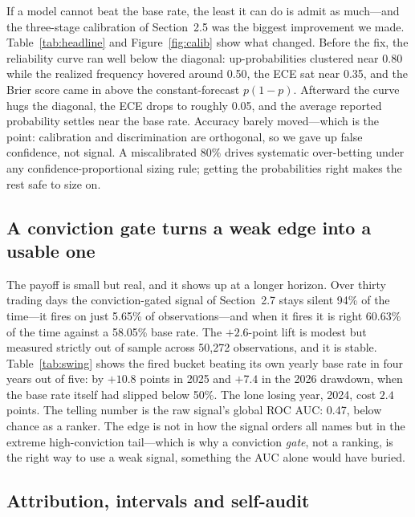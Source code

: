 \documentclass[12pt,a4paper]{article}
\begin{document}
If a model cannot beat the base rate, the least it can do is admit as much---and the
three-stage calibration of Section~2.5 was the biggest improvement we made.
Table~\ref{tab:headline} and Figure~\ref{fig:calib} show what changed. Before the
fix, the reliability curve ran well below the diagonal: up-probabilities clustered
near 0.80 while the realized frequency hovered around 0.50, the ECE sat near 0.35,
and the Brier score came in above the constant-forecast $p(1-p)$. Afterward the
curve hugs the diagonal, the ECE drops to roughly 0.05, and the average reported
probability settles near the base rate. Accuracy barely moved---which is the point:
calibration and discrimination are orthogonal, so we gave up false confidence, not
signal. A miscalibrated 80\% drives systematic over-betting under any
confidence-proportional sizing rule; getting the probabilities right makes the rest
safe to size on.

\subsection{A conviction gate turns a weak edge into a usable one}

The payoff is small but real, and it shows up at a longer horizon. Over thirty
trading days the conviction-gated signal of Section~2.7 stays silent 94\% of the
time---it fires on just 5.65\% of observations---and when it fires it is right
60.63\% of the time against a 58.05\% base rate. The $+2.6$-point lift is modest
but measured strictly out of sample across 50{,}272 observations, and it is stable.
Table~\ref{tab:swing} shows the fired bucket beating
its own yearly base rate in four years out of five: by $+10.8$ points in 2025 and
$+7.4$ in the 2026 drawdown, when the base rate itself had slipped below 50\%. The
lone losing year, 2024, cost $2.4$ points. The telling number is the raw signal's
global ROC AUC: 0.47, below chance as a ranker. The edge is not in how the signal
orders all names but in the extreme high-conviction tail---which is why a
conviction \emph{gate}, not a ranking, is the right way to use a weak signal,
something the AUC alone would have buried.

\subsection{Attribution, intervals and self-audit}
\end{document}
